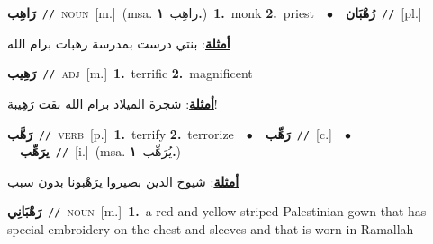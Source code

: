 \documentclass[10pt,a4paper,twoside]{article} %
\begin{document}
\begin{multicols}{2}
{\setlength\topsep{0pt}\textbf{\foreignlanguage{arabic}{رَاهِب}}\ {\color{gray}\texttt{//}\color{black}}\ \textsc{noun}\ [m.]\ \color{gray}(msa. \foreignlanguage{arabic}{راهِب}~\foreignlanguage{arabic}{\textbf{١.}})\color{black}\ \textbf{1.}~monk  \textbf{2.}~priest\ \ $\bullet$\ \ \setlength\topsep{0pt}\textbf{\foreignlanguage{arabic}{رُهْبَان}}\ {\color{gray}\texttt{//}\color{black}}\ [pl.]\  \begin{flushright}\color{gray}\foreignlanguage{arabic}{\textbf{\underline{\foreignlanguage{arabic}{أمثلة}}}: بنتي درست بمدرسة رهبات برام الله}\end{flushright}\color{black}} \vspace{2mm}

{\setlength\topsep{0pt}\textbf{\foreignlanguage{arabic}{رَهِيب}}\ {\color{gray}\texttt{//}\color{black}}\ \textsc{adj}\ [m.]\ \textbf{1.}~terrific  \textbf{2.}~magnificent\  \begin{flushright}\color{gray}\foreignlanguage{arabic}{\textbf{\underline{\foreignlanguage{arabic}{أمثلة}}}: شجرة الميلاد برام الله بقت رَهِيبة!}\end{flushright}\color{black}} \vspace{2mm}

{\setlength\topsep{0pt}\textbf{\foreignlanguage{arabic}{رَهَّب}}\ {\color{gray}\texttt{//}\color{black}}\ \textsc{verb}\ [p.]\ \textbf{1.}~terrify  \textbf{2.}~terrorize\ \ $\bullet$\ \ \setlength\topsep{0pt}\textbf{\foreignlanguage{arabic}{رَهِّب}}\ {\color{gray}\texttt{//}\color{black}}\ [c.]\ \ $\bullet$\ \ \setlength\topsep{0pt}\textbf{\foreignlanguage{arabic}{يرَهِّب}}\ {\color{gray}\texttt{//}\color{black}}\ [i.]\ \color{gray}(msa. \foreignlanguage{arabic}{يُرَهِّب}~\foreignlanguage{arabic}{\textbf{١.}})\color{black}\  \begin{flushright}\color{gray}\foreignlanguage{arabic}{\textbf{\underline{\foreignlanguage{arabic}{أمثلة}}}: شيوخ الدين بصيروا يرَهْبونا بدون سبب}\end{flushright}\color{black}} \vspace{2mm}

{\setlength\topsep{0pt}\textbf{\foreignlanguage{arabic}{رَهْبَانِي}}\ {\color{gray}\texttt{//}\color{black}}\ \textsc{noun}\ [m.]\ \textbf{1.}~a red and yellow striped Palestinian gown that has special embroidery on the chest and sleeves and that is worn in Ramallah\ } \vspace{2mm}


\end{multicols}
\end{document}
